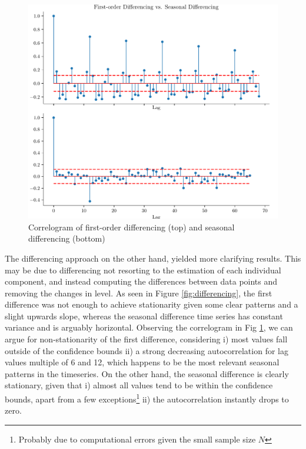 \documentclass[conference]{IEEEtran}
\begin{document}
\begin{figure}[hbtp]
    \centering
    \includegraphics[scale=0.7]{../figs/acs_diff.pdf}
    \caption{Correlogram of first-order differencing (top) and seasonal differencing (bottom)}
    \label{fig:acs_diff}
\end{figure}

The differencing approach on the other hand, yielded more clarifying results. This may be due to differencing not resorting to the estimation of each individual component, and instead computing the differences between data points and removing the changes in level. As seen in Figure \ref{fig:differencing}, the first difference was not enough to achieve stationarity given some clear patterns and a slight upwards slope, whereas the seasonal difference time series has constant variance and is arguably horizontal. Observing the correlogram in Fig \ref{fig:acs_diff}, we can argue for non-stationarity of the first difference, considering i) most values fall outside of the confidence bounds ii) a strong decreasing autocorrelation for lag values multiple of 6 and 12, which happens to be the most relevant seasonal patterns in the timeseries. On the other hand, the seasonal difference is clearly stationary, given that i) almost all values tend to be within the confidence bounds, apart from a few exceptions\footnote{Probably due to computational errors given the small sample size $N$} ii) the autocorrelation instantly drops to zero.
\end{document}
